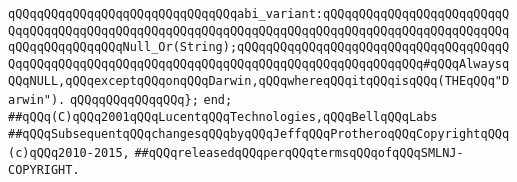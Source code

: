 \verb|qQQqqQQqqQQqqQQqqQQqqQQqqQQqqQQqabi_variant:qQQqqQQqqQQqqQQqqQQqqQQqqQQqqQQqqQQqqQQqqQQqqQQqqQQqqQQqqQQqqQQqqQQqqQQqqQQqqQQqqQQqqQQqqQQqqQQqqQQqqQQqqQQqqQQqNull_Or(String);qQQqqQQqqQQqqQQqqQQqqQQqqQQqqQQqqQQqqQQqqQQqqQQqqQQqqQQqqQQqqQQqqQQqqQQqqQQqqQQqqQQqqQQqqQQqqQQq#qQQqAlwaysqQQqNULL,qQQqexceptqQQqonqQQqDarwin,qQQqwhereqQQqitqQQqisqQQq(THEqQQq"Darwin").|\newline
\verb|qQQqqQQqqQQqqQQq};|\newline
\verb|end;|\newline
\newline
\newline
\newline
\verb|##qQQq(C)qQQq2001qQQqLucentqQQqTechnologies,qQQqBellqQQqLabs|\newline
\verb|##qQQqSubsequentqQQqchangesqQQqbyqQQqJeffqQQqProtheroqQQqCopyrightqQQq(c)qQQq2010-2015,|\newline
\verb|##qQQqreleasedqQQqperqQQqtermsqQQqofqQQqSMLNJ-COPYRIGHT.|\newline

